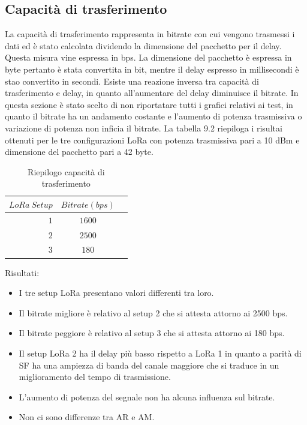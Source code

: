 \documentclass[12pt,a4paper,openright,twoside]{report}
\begin{document}
\subsection{Capacit\`a di trasferimento}
La capacit\`a di trasferimento rappresenta in bitrate con cui vengono trasmessi i dati ed \`e stato calcolata dividendo la dimensione del pacchetto per il delay. Questa misura vine espressa in bps.
La dimensione del pacchetto \`e espressa in byte pertanto \`e stata convertita in bit, mentre il delay espresso in millisecondi \`e stao convertito in secondi.
Esiste una reazione inversa tra capacit\`a di trasferimento e delay, in quanto all'aumentare del delay diminuisce il bitrate. In questa sezione \`e stato scelto di non riportatare tutti i grafici relativi ai test, in quanto il bitrate ha un andamento costante e l'aumento di potenza trasmissiva o variazione di potenza non inficia il bitrate. La tabella 9.2 riepiloga i risultai ottenuti per le tre configurazioni LoRa con potenza trasmissiva pari a 10 dBm e dimensione del pacchetto pari a 42 byte. 

\begin{table}[h]                        
\begin{center}                          
\begin{tabular}{r|c|c}                  
$LoRa\ Setup$ & $Bitrate (bps)$ \\         
\hline\hline                                  
$1$ & $1600$\\     
\hline                               
$2$ & $2500$ \\
\hline        
$3$ & $180$\\ 
\hline \hline                         
\end{tabular}
\caption[Riepilogo capacit\`a di trasferimento]{Riepilogo capacit\`a di trasferimento}\label{tab:uno}
\end{center}
\end{table}

Risultati:
\begin{itemize}    
\item I tre setup LoRa presentano valori differenti tra loro.
\item Il bitrate migliore \`e relativo al setup 2 che si attesta attorno ai 2500 bps.
\item Il bitrate peggiore \`e relativo al setup 3 che si attesta attorno ai 180 bps.
\item Il setup LoRa 2 ha il delay pi\`u basso rispetto a LoRa 1 in quanto a parit\`a di SF ha una ampiezza di banda del canale maggiore che si traduce in un miglioramento del tempo di trasmissione.
\item L'aumento di potenza del segnale non ha alcuna influenza sul bitrate.
\item Non ci sono differenze tra AR e AM.
\end{itemize}
\end{document}
